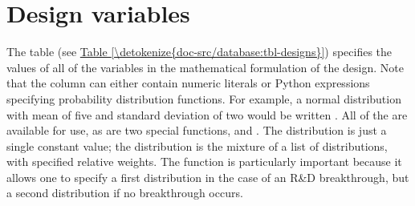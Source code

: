 \documentclass[letterpaper,10pt,english]{sphinxmanual}
\begin{document}
\section{Design variables}
\label{\detokenize{doc-src/database:design-variables}}
The  table (see \hyperref[\detokenize{doc-src/database:tbl-designs}]{Table \ref{\detokenize{doc-src/database:tbl-designs}}}) specifies the values of all of
the variables in the mathematical formulation of the design. Note that
the  column can either contain numeric literals or Python
expressions specifying probability distribution functions. For example,
a normal distribution with mean of five and standard deviation of two
would be written . All of the 
are available for use, as are two special functions,  and
. The  distribution is just a single constant
value; the  distribution is the mixture of a list of
distributions, with specified relative weights. The  function
is particularly important because it allows one to specify a first
distribution in the case of an R\&D breakthrough, but a second
distribution if no breakthrough occurs.
\end{document}
